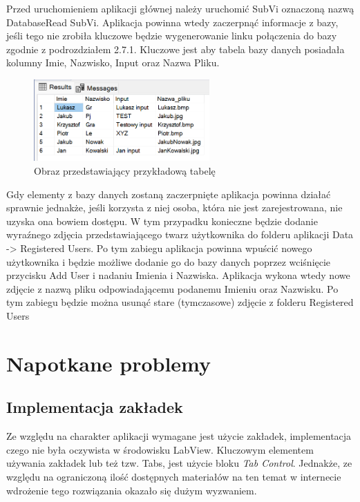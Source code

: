 \documentclass{report}
\begin{document}
Przed uruchomieniem aplikacji głównej należy uruchomić SubVi oznaczoną nazwą DatabaseRead SubVi. Aplikacja powinna wtedy zaczerpnąć informacje z bazy, jeśli tego nie zrobiła
kluczowe będzie wygenerowanie linku połączenia do bazy zgodnie z podrozdziałem 2.7.1. Kluczowe jest aby tabela bazy danych posiadała kolumny Imie, Nazwisko, Input oraz Nazwa Pliku.

\begin{figure}[H]
    \centering
    \includegraphics[width=0.6\textwidth]{src/Database/Microsoft SQL.png}
    \caption{Obraz przedstawiający przykładową tabelę}
    \label{fig:first-att}
\end{figure}

Gdy elementy z bazy danych zostaną zaczerpnięte aplikacja powinna działać sprawnie jednakże, jeśli korzysta z niej osoba, która nie jest zarejestrowana, nie uzyska ona bowiem dostępu.
W tym przypadku konieczne będzie dodanie wyraźnego zdjęcia przedstawiającego twarz użytkownika do folderu aplikacji Data -> Registered Users. Po tym zabiegu aplikacja powinna wpuścić nowego użytkownika
i będzie możliwe dodanie go do bazy danych poprzez wciśnięcie przycisku Add User i nadaniu Imienia i Nazwiska. Aplikacja wykona wtedy nowe zdjęcie z nazwą pliku odpowiadającemu podanemu Imieniu oraz Nazwisku.
Po tym zabiegu będzie można usunąć stare (tymczasowe) zdjęcie z folderu Registered Users



\section{\LARGE Napotkane problemy}
\subsection{\Large Implementacja zakładek}

Ze względu na charakter aplikacji wymagane jest użycie zakładek, implementacja czego nie była oczywista w środowisku LabView. Kluczowym elementem używania zakładek lub też tzw. Tabs, jest użycie bloku \textit{Tab Control}. Jednakże, ze względu na ograniczoną ilość dostępnych materiałów na ten temat w internecie wdrożenie tego rozwiązania okazało się dużym wyzwaniem. 
\end{document}
